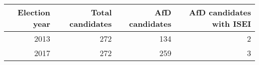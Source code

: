 \begin{table}[!h]
\centering
\begin{tabular}[t]{rrrr}
\toprule
Election year & Total candidates & AfD candidates & AfD candidates with ISEI\\
\midrule
2013 & 272 & 134 & 2\\
2017 & 272 & 259 & 3\\
\bottomrule
\end{tabular}
\end{table}
